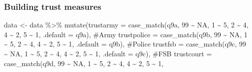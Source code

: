 \documentclass[
  letterpaper,
  DIV=11,
  numbers=noendperiod]{scrartcl}
\newenvironment{Shaded}{\begin{snugshade}}{\end{snugshade}}
\newcommand{\AttributeTok}[1]{\textcolor[rgb]{0.40,0.45,0.13}{#1}}
\newcommand{\CommentTok}[1]{\textcolor[rgb]{0.37,0.37,0.37}{#1}}
\newcommand{\ConstantTok}[1]{\textcolor[rgb]{0.56,0.35,0.01}{#1}}
\newcommand{\DecValTok}[1]{\textcolor[rgb]{0.68,0.00,0.00}{#1}}
\newcommand{\FunctionTok}[1]{\textcolor[rgb]{0.28,0.35,0.67}{#1}}
\newcommand{\NormalTok}[1]{\textcolor[rgb]{0.00,0.23,0.31}{#1}}
\newcommand{\OtherTok}[1]{\textcolor[rgb]{0.00,0.23,0.31}{#1}}
\newcommand{\SpecialCharTok}[1]{\textcolor[rgb]{0.37,0.37,0.37}{#1}}
\begin{document}
\subsubsection{Building trust measures}\label{building-trust-measures}

\begin{Shaded}
\begin{Highlighting}[]
\NormalTok{data }\OtherTok{\textless{}{-}}\NormalTok{ data }\SpecialCharTok{\%\textgreater{}\%} 
  \FunctionTok{mutate}\NormalTok{(}\AttributeTok{trustarmy =} \FunctionTok{case\_match}\NormalTok{(q9a, }\DecValTok{99} \SpecialCharTok{\textasciitilde{}} \ConstantTok{NA}\NormalTok{, }\DecValTok{1} \SpecialCharTok{\textasciitilde{}} \DecValTok{5}\NormalTok{, }\DecValTok{2} \SpecialCharTok{\textasciitilde{}} \DecValTok{4}\NormalTok{, }\DecValTok{4} \SpecialCharTok{\textasciitilde{}} \DecValTok{2}\NormalTok{, }\DecValTok{5} \SpecialCharTok{\textasciitilde{}} \DecValTok{1}\NormalTok{, }
                                \AttributeTok{.default =}\NormalTok{ q9a), }\CommentTok{\#Army}
         \AttributeTok{trustpolice =} \FunctionTok{case\_match}\NormalTok{(q9b, }\DecValTok{99} \SpecialCharTok{\textasciitilde{}} \ConstantTok{NA}\NormalTok{, }\DecValTok{1} \SpecialCharTok{\textasciitilde{}} \DecValTok{5}\NormalTok{, }\DecValTok{2} \SpecialCharTok{\textasciitilde{}} \DecValTok{4}\NormalTok{, }\DecValTok{4} \SpecialCharTok{\textasciitilde{}} \DecValTok{2}\NormalTok{, }\DecValTok{5} \SpecialCharTok{\textasciitilde{}} \DecValTok{1}\NormalTok{, }
                                  \AttributeTok{.default =}\NormalTok{ q9b), }\CommentTok{\#Police}
         \AttributeTok{trustfsb =} \FunctionTok{case\_match}\NormalTok{(q9c, }\DecValTok{99} \SpecialCharTok{\textasciitilde{}} \ConstantTok{NA}\NormalTok{, }\DecValTok{1} \SpecialCharTok{\textasciitilde{}} \DecValTok{5}\NormalTok{, }\DecValTok{2} \SpecialCharTok{\textasciitilde{}} \DecValTok{4}\NormalTok{, }\DecValTok{4} \SpecialCharTok{\textasciitilde{}} \DecValTok{2}\NormalTok{, }\DecValTok{5} \SpecialCharTok{\textasciitilde{}} \DecValTok{1}\NormalTok{, }
                               \AttributeTok{.default =}\NormalTok{ q9c), }\CommentTok{\#FSB}
         \AttributeTok{trustcourt =} \FunctionTok{case\_match}\NormalTok{(q9d, }\DecValTok{99} \SpecialCharTok{\textasciitilde{}} \ConstantTok{NA}\NormalTok{, }\DecValTok{1} \SpecialCharTok{\textasciitilde{}} \DecValTok{5}\NormalTok{, }\DecValTok{2} \SpecialCharTok{\textasciitilde{}} \DecValTok{4}\NormalTok{, }\DecValTok{4} \SpecialCharTok{\textasciitilde{}} \DecValTok{2}\NormalTok{, }\DecValTok{5} \SpecialCharTok{\textasciitilde{}} \DecValTok{1}\NormalTok{, }

\end{Highlighting}
\end{Shaded}
\end{document}
